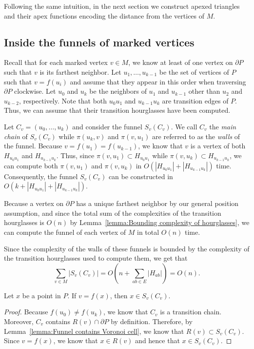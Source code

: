 \documentclass[a4paper,UKenglish]{lipics}
\newcommand{\fn}[2]{\ensuremath{S_{\scriptscriptstyle #1}(#2)}}
\newcommand{\ff}[1]{\ensuremath{f(#1)}}
\newcommand{\p}[2]{\ensuremath{\pi(#1, #2)}}
\begin{document}
Following the same intuition, in the next section we construct apexed triangles and their apex functions encoding the distance from the vertices of $M$.

\subsection{Inside the funnels of marked vertices}
Recall that for each marked vertex $v\in M$, we know at least of one vertex on $\partial P$ such that $v$ is its farthest neighbor.
Let $u_1, \ldots, u_{k-1}$ be the set of vertices of $P$ such that $v = \ff{u_i}$ and assume that they appear in this order when traversing $\partial P$ clockwise. Let $u_0$ and $u_k$ be the neighbors of $u_1$ and $u_{k-1}$ other than $u_2$ and $u_{k-2}$, respectively. Note that both $u_0 u_1$ and $u_{k-1}u_k$ are transition edges of $P$. Thus, we can assume that their transition hourglasses have been computed.

Let $C_v = (u_0, \ldots, u_k)$ and consider the funnel $\fn{v}{C_v}$.
We call $C_v$ the \emph{main chain} of $\fn{v}{C_v}$ while $\p{u_k}{ v}$ and $\p{v}{ u_1}$ are referred to as the \emph{walls} of the funnel.  
Because $v = \ff{u_1} = \ff{u_{k-1}}$, we know that $v$ is a vertex of both $H_{u_0 u_1}$ and  $H_{u_{k-1}u_k}$. 
Thus, since $\p{v}{ u_1}\subset H_{u_0u_1}$ while $\p{v}{u_k}\subset H_{u_{k-1}u_k}$, we can compute both $\p{v}{ u_1}$ and $\p{v}{u_k}$ in $O( |H_{u_0 u_1}| + |H_{u_{k-1}u_k}|)$ time.
Consequently, the funnel $\fn{v}{C_v}$ can be constructed in $O(k + |H_{u_0 u_1}| + |H_{u_{k-1}u_k}|)$. 

Because a vertex on $\partial P$ has a unique farthest neighbor by our general position assumption, and since the total sum of the complexities of the transition hourglasses is $O(n)$ by Lemma~\ref{lemma:Bounding complexity of hourglasses}, we can compute the funnel of each vertex of $M$ in total $O(n)$ time. 

Since the complexity of the walls of these funnels is bounded by the complexity of the transition hourglasses used to compute them, we get that $$\sum_{v\in M} |\fn{v}{C_v}|  = O\left(n + \sum_{ab\in E} |H_{ab}|\right) = O(n).$$

\begin{lemma}\label{lemma:Farthest points from marked are in funnel}
Let $x$ be a point in $P$. If $v = \ff{x}$, then $x\in \fn{v}{C_v}$.
\end{lemma}
\begin{proof}
Because $\ff{u_0} \neq \ff{u_k}$, we know that $C_v$ is a transition chain. Moreover, $C_v$ contains $R(v)\cap \partial P$ by definition. Therefore, by Lemma~\ref{lemma:Funnel contains Voronoi cell}, we know that $R(v)\subset \fn{v}{C_v}$.
Since $v = \ff{x}$, we know that $x\in R(v)$ and hence that $x \in \fn{v}{C_v}$. 
\end{proof}
\end{document}
